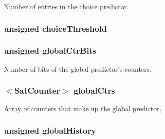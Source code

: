 \label{classTournamentBP_aa71f36048f2ff08f22872c928bb15ad7}
Number of entries in the choice predictor. \hypertarget{classTournamentBP_a6de119a3b475137cbfab3f2a0604886b}{
\subsubsection[{choiceThreshold}]{\setlength{\rightskip}{0pt plus 5cm}unsigned {\bf choiceThreshold}}}
\label{classTournamentBP_a6de119a3b475137cbfab3f2a0604886b}
\hypertarget{classTournamentBP_a21c0cae328ca40466ae7e247bd62373f}{
\subsubsection[{globalCtrBits}]{\setlength{\rightskip}{0pt plus 5cm}unsigned {\bf globalCtrBits}}}
\label{classTournamentBP_a21c0cae328ca40466ae7e247bd62373f}
Number of bits of the global predictor's counters. \hypertarget{classTournamentBP_aa8fc28af97afce3a4f54e4924f7d4815}{
\subsubsection[{globalCtrs}]{$<${\bf SatCounter}$>$ {\bf globalCtrs}}}
\label{classTournamentBP_aa8fc28af97afce3a4f54e4924f7d4815}
Array of counters that make up the global predictor. \hypertarget{classTournamentBP_a48805f17e95aa944cb6eda2fcf061adf}{
\subsubsection[{globalHistory}]{\setlength{\rightskip}{0pt plus 5cm}unsigned {\bf globalHistory}}}
